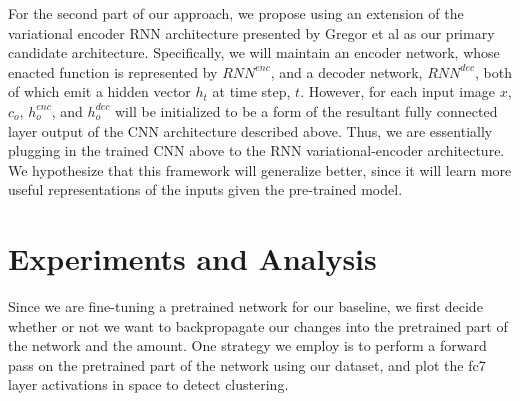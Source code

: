 \documentclass[twocolumn]{article}
\begin{document}
For the second part of our approach, we propose using an extension of the variational encoder RNN architecture presented by Gregor et al as our primary candidate architecture. Specifically, we will maintain an encoder network, whose enacted function is represented by $RNN^{enc}$, and a decoder network, $RNN^{dec}$, both of which emit a hidden vector $h_t$ at time step, $t$. However, for each input image $x$, $c_o$, $h_o^{enc}$, and $h_o^{dec}$ will be initialized to be a form of the resultant fully connected layer output of the CNN architecture described above. Thus, we are essentially plugging in the trained CNN above to the RNN variational-encoder architecture. We hypothesize that this framework will generalize better, since it will learn more useful representations of the inputs given the pre-trained model.

\section{Experiments and Analysis}
Since we are fine-tuning a pretrained network for our baseline, we first decide whether or not we want to backpropagate our changes into the pretrained part of the network and the amount. One strategy we employ is to perform a forward pass on the pretrained part of the network using our dataset, and plot the fc7 layer activations in space to detect clustering.
\end{document}
